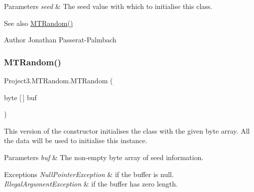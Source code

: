 \begin{DoxyParams}{Parameters}
{\em seed} & The seed value with which to initialise this class. \\
\hline
\end{DoxyParams}
\begin{DoxySeeAlso}{See also}
\mbox{\hyperlink{class_project3_1_1_m_t_random_a53aed3686fa87293ed7b65b706086dab}{M\+T\+Random()}} 
\end{DoxySeeAlso}
\begin{DoxyAuthor}{Author}
Jonathan Passerat-\/\+Palmbach 
\end{DoxyAuthor}
\mbox{\label{class_project3_1_1_m_t_random_aa76f9e441fff43fc2d1d84c3b33a2535}} 
\subsubsection{\texorpdfstring{MTRandom()}{MTRandom()}\hspace{0.1cm}{\footnotesize\ttfamily [4/5]}}
{\footnotesize\ttfamily Project3.\+M\+T\+Random.\+M\+T\+Random (\begin{DoxyParamCaption}\item[{byte \mbox{[}$\,$\mbox{]}}]{buf }\end{DoxyParamCaption})}

This version of the constructor initialises the class with the given byte array. All the data will be used to initialise this instance.


\begin{DoxyParams}{Parameters}
{\em buf} & The non-\/empty byte array of seed information. \\
\hline
\end{DoxyParams}

\begin{DoxyExceptions}{Exceptions}
{\em Null\+Pointer\+Exception} & if the buffer is null. \\
\hline
{\em Illegal\+Argument\+Exception} & if the buffer has zero length. \\
\hline
\end{DoxyExceptions}
\mbox{\label{class_project3_1_1_m_t_random_ad01dc6b80432b956ebe61d3b9b320355}} 
